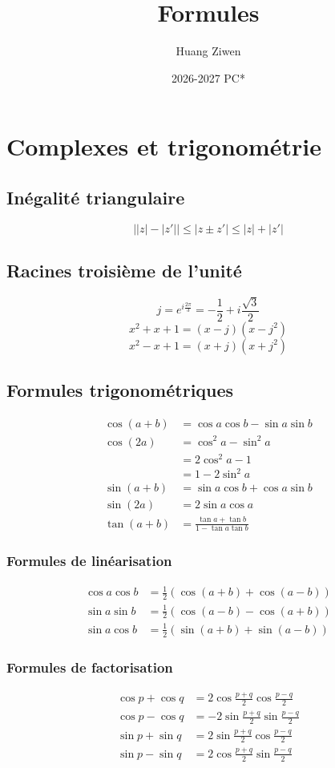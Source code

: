 \documentclass[]{article}
\title{Formules}
\author{Huang Ziwen}
\date{2026-2027 PC*}
\begin{document}
\section{Complexes et trigonométrie}
\subsection*{Inégalité triangulaire}
\[ \left||z|-|z'|\right| \leq |z \pm z'| \leq |z|+|z'| \]

\subsection*{Racines troisième de l'unité}
\[j=e^{i\frac{2\pi}{3}} = -\frac{1}{2} + i \frac{\sqrt{3}}{2}\]
\[x^2 + x + 1 = (x - j)(x - j^2)\]
\[x^2 - x + 1 = (x + j)(x + j^2)\]

\subsection*{Formules trigonométriques}
\begin{align*}
    \cos{(a+b)} &= \cos{a}\cos{b}-\sin{a}\sin{b} \\
    \cos{(2a)} &= \cos^2{a} - \sin^2{a} \\
    &= 2\cos^2{a} -1 \\
    &= 1- 2\sin^2{a} \\
    \sin{(a+b)} &= \sin{a}\cos{b}+\cos{a}\sin{b} \\
    \sin{(2a)} &= 2\sin{a}\cos{a} \\
    \tan{(a+b)} &= \frac{\tan{a}+\tan{b}}{1-\tan{a}\tan{b}}
\end{align*}

\subsubsection*{Formules de linéarisation}
\begin{align*}
    \cos{a}\cos{b} &= \frac{1}{2}(\cos{(a+b)}+\cos{(a-b)}) \\
    \sin{a}\sin{b} &= \frac{1}{2}(\cos{(a-b)}-\cos{(a+b)}) \\
    \sin{a}\cos{b} &= \frac{1}{2}(\sin{(a+b)}+\sin{(a-b)})
\end{align*}

\subsubsection*{Formules de factorisation}
\begin{align*}
    \cos{p}+\cos{q} &= 2\cos{\frac{p+q}{2}}\cos{\frac{p-q}{2}} \\
    \cos{p}-\cos{q} &= -2\sin{\frac{p+q}{2}}\sin{\frac{p-q}{2}} \\
    \sin{p}+\sin{q} &= 2\sin{\frac{p+q}{2}}\cos{\frac{p-q}{2}} \\
    \sin{p}-\sin{q} &= 2\cos{\frac{p+q}{2}}\sin{\frac{p-q}{2}}
\end{align*}
\end{document}
